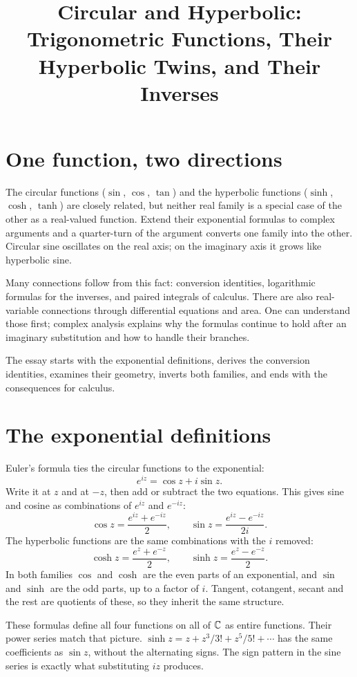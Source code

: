 \documentclass{essay}
\title{Circular and Hyperbolic:\\
Trigonometric Functions, Their Hyperbolic Twins, and Their Inverses}
\author{}
\date{}
\begin{document}
\maketitle

\section{One function, two directions}

The circular functions ($\sin$, $\cos$, $\tan$) and the hyperbolic functions
($\sinh$, $\cosh$, $\tanh$) are closely related, but neither real family is a
special case of the other as a real-valued function. Extend their exponential
formulas to complex arguments and a quarter-turn of the argument converts one
family into the other. Circular sine oscillates on the real axis; on the
imaginary axis it grows like hyperbolic sine.

Many connections follow from this fact: conversion identities, logarithmic
formulas for the inverses, and paired integrals of calculus. There are also
real-variable connections through differential equations and area. One can
understand those first; complex analysis explains why the formulas continue to
hold after an imaginary substitution and how to handle their branches.

The essay starts with the exponential definitions, derives the conversion
identities, examines their geometry, inverts both families, and ends with the
consequences for calculus.

\section{The exponential definitions}

Euler's formula ties the circular functions to the exponential:
\[
  e^{iz} = \cos z + i \sin z .
\]
Write it at $z$ and at $-z$, then add or subtract the two equations. This gives
sine and cosine as combinations of $e^{iz}$ and $e^{-iz}$:
\[
  \cos z = \frac{e^{iz} + e^{-iz}}{2}, \qquad
  \sin z = \frac{e^{iz} - e^{-iz}}{2i}.
\]
The hyperbolic functions are the same combinations with the $i$ removed:
\[
  \cosh z = \frac{e^{z} + e^{-z}}{2}, \qquad
  \sinh z = \frac{e^{z} - e^{-z}}{2}.
\]
In both families $\cos$ and $\cosh$ are the even parts of an exponential, and
$\sin$ and $\sinh$ are the odd parts, up to a factor of $i$. Tangent, cotangent,
secant and the rest are quotients of these, so they inherit the same structure.

These formulas define all four functions on all of $\mathbb{C}$ as entire functions.
Their power series match that picture.
$\sinh z = z + z^3/3! + z^5/5! + \cdots$ has the same coefficients as $\sin z$,
without the alternating signs. The sign pattern in the sine series is exactly
what substituting $iz$ produces.
\end{document}
